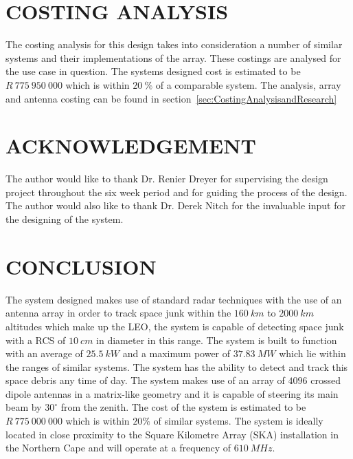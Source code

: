 \documentclass[11pt]{witseiepaper}
\begin{document}
\begin{bibunit}[witseie]

\section{COSTING ANALYSIS} \label{sec:CostingAnalysis}
The costing analysis for this design takes into consideration a number of similar systems and their implementations of the array. These costings are analysed for the use case in question.
The systems designed cost is estimated to be $R~775~950~000$ which is within $20~\%$ of a comparable system.
The analysis, array and antenna costing can be found in section~\ref{sec:CostingAnalysisandResearch}


\section*{ACKNOWLEDGEMENT} \label{sec:ACKNOWLEDGEMENT}
The author would like to thank Dr. Renier Dreyer for supervising the design project throughout the six week period and for guiding the process of the design.
The author would also like to thank Dr. Derek Nitch for the invaluable input for the designing of the system.


\section{CONCLUSION} \label{sec:CONCLUSION}
The system designed makes use of standard radar techniques with the use of an antenna array in order to track space junk within the $160~km$ to $2000~km$ altitudes which make up the LEO, the system is capable of detecting space junk with a RCS of $10~cm$ in diameter in this range. The system is built to function with an average of $25.5~kW$ and a maximum power of $37.83~MW$ which lie within the ranges of similar systems. The system has the ability to detect and track this space debris any time of day. The system makes use of an array of $4096$ crossed dipole antennas in a matrix-like geometry and it is capable of steering its main beam by $30^{\circ}$ from the zenith.
The cost of the system is estimated to be $R~775~000~000$ which is within $20\%$ of similar systems. The system is ideally located in close proximity to the Square Kilometre Array (SKA) installation in the Northern Cape and will operate at a frequency of $610~MHz$.   
% 
% 

\putbib[references]
\end{bibunit}
\end{document}
